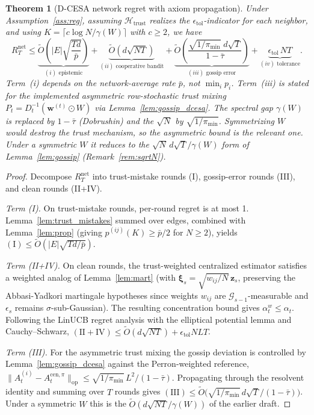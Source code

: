 \documentclass[11pt]{article}
\newtheorem{theorem}{Theorem}[section]
\begin{document}
\begin{theorem}[D-CESA network regret with axiom propagation]
\label{thm:dcesa}
Under Assumption~\ref{ass:reg}, assuming $\mathcal{H}_{\mathrm{trust}}$
realizes the $\epsilon_{\mathrm{tol}}$-indicator for each neighbor,
and using $K=\lceil c\log N/\gamma(W)\rceil$ with $c\geq 2$, we have
\begin{equation}
R_T^{\mathrm{net}}\leq
\underbrace{\widetilde{O}\!\left(|E|\sqrt{\frac{Td}{\bar{p}}}\right)}_{(i)\text{ epistemic}}
+\underbrace{\widetilde{O}\!\left(d\sqrt{NT}\right)}_{(ii)\text{ cooperative bandit}}
+\underbrace{\widetilde{O}\!\left(\frac{\sqrt{1/\pi_{\min}}\;d\sqrt{T}}{1-\bar\tau}\right)}_{(iii)\text{ gossip error}}
+\underbrace{\epsilon_{\mathrm{tol}}\,NT}_{(iv)\text{ tolerance}}.
\label{eq:dcesa}
\end{equation}
Term~(i) depends on the network-average rate $\bar{p}$, not $\min_i p_i$.
Term~(iii) is stated for the implemented \emph{asymmetric}
row-stochastic trust mixing $P_t=D_t^{-1}(\bm w^{(t)}\odot W)$ via
Lemma~\ref{lem:gossip_dcesa}. The spectral gap $\gamma(W)$ is replaced by
$1-\bar\tau$ (Dobrushin) and the $\sqrt N$ by $\sqrt{1/\pi_{\min}}$.
Symmetrizing $W$ would destroy the trust mechanism, so the asymmetric
bound is the relevant one.  Under a symmetric $W$ it reduces to the
$\sqrt N\,d\sqrt T/\gamma(W)$ form of Lemma~\ref{lem:gossip}
(Remark~\ref{rem:sqrtN}).
\end{theorem}

\begin{proof}
Decompose $R_T^{\mathrm{net}}$ into trust-mistake rounds (I),
gossip-error rounds (III), and clean rounds (II+IV).

\textit{Term (I).}
On trust-mistake rounds, per-round regret is at most 1.
Lemma~\ref{lem:trust_mistakes} summed over edges, combined with
Lemma~\ref{lem:prop} (giving $p^{(ij)}(K)\geq\bar{p}/2$ for $N\geq 2$),
yields $(\mathrm{I})\leq\widetilde{O}(|E|\sqrt{Td/\bar{p}})$.

\textit{Term (II+IV).}
On clean rounds, the trust-weighted centralized estimator satisfies
a weighted analog of Lemma~\ref{lem:mart} (with
$\bm{\xi}_s=\sqrt{w_{ij}/N}\,\bm{z}_s$, preserving the
Abbasi-Yadkori martingale hypotheses since weights $w_{ij}$ are
$\mathcal{G}_{s-1}$-measurable and $\epsilon_s$ remains
$\sigma$-sub-Gaussian).  The resulting concentration bound gives
$\alpha_t^w\leq\alpha_t$.  Following the LinUCB regret analysis with
the elliptical potential lemma and Cauchy--Schwarz,
$(\mathrm{II+IV})\leq\widetilde{O}(d\sqrt{NT})+\epsilon_{\mathrm{tol}}NLT$.

\textit{Term (III).}
For the asymmetric trust mixing the gossip deviation is controlled by
Lemma~\ref{lem:gossip_dcesa} against the Perron-weighted reference,
$\|A_t^{(i)}-A_t^{\mathrm{cen},\pi}\|_{\mathrm{op}}
\leq\sqrt{1/\pi_{\min}}\,L^2/(1-\bar\tau)$.
Propagating through the resolvent identity and summing over $T$ rounds
gives $(\mathrm{III})\leq\widetilde{O}\!\bigl(\sqrt{1/\pi_{\min}}\,
d\sqrt{T}/(1-\bar\tau)\bigr)$.  Under a symmetric $W$ this is the
$\widetilde O(d\sqrt{NT}/\gamma(W))$ of the earlier draft.
\end{proof}
\end{document}
